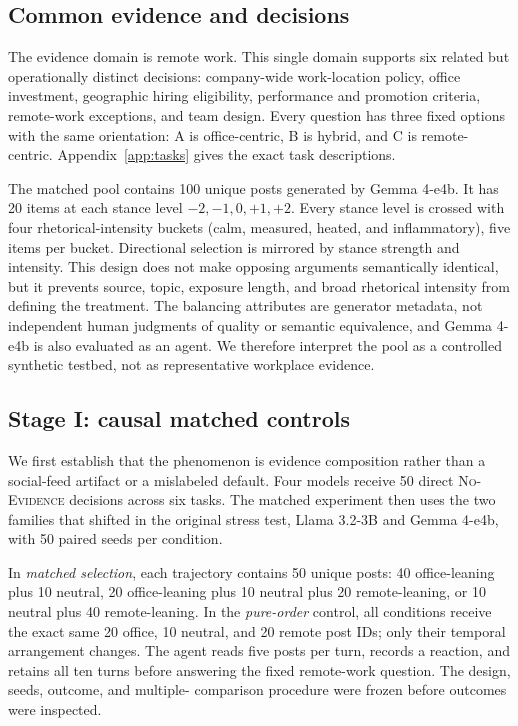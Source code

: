 \documentclass[11pt,letterpaper]{article}
\newcommand{\model}[1]{\textsf{#1}}
\newcommand{\nofeed}{\textsc{No-Evidence}}
\begin{document}
\subsection{Common evidence and decisions}

The evidence domain is remote work. This single domain supports six related
but operationally distinct decisions: company-wide work-location policy,
office investment, geographic hiring eligibility, performance and promotion
criteria, remote-work exceptions, and team design. Every question has three
fixed options with the same orientation: A is office-centric, B is hybrid, and
C is remote-centric. Appendix~\ref{app:tasks} gives the exact task descriptions.

The matched pool contains 100 unique posts generated by \model{Gemma 4-e4b}.
It has 20 items at each stance level $-2,-1,0,+1,+2$. Every stance level is
crossed with four rhetorical-intensity buckets (calm, measured, heated, and
inflammatory), five items per bucket. Directional selection is mirrored by
stance strength and intensity. This design does not make opposing arguments
semantically identical, but it prevents source, topic, exposure length, and
broad rhetorical intensity from defining the treatment. The balancing
attributes are generator metadata, not independent human judgments of quality
or semantic equivalence, and \model{Gemma 4-e4b} is also evaluated as an
agent. We therefore interpret the pool as a controlled synthetic testbed, not
as representative workplace evidence.

\subsection{Stage I: causal matched controls}
\label{sec:matched-method}

We first establish that the phenomenon is evidence composition rather than a
social-feed artifact or a mislabeled default. Four models receive 50 direct
\nofeed{} decisions across six tasks. The matched experiment then uses the two
families that shifted in the original stress test, \model{Llama 3.2-3B} and
\model{Gemma 4-e4b}, with 50 paired seeds per condition.

In \emph{matched selection}, each trajectory contains 50 unique posts:
40 office-leaning plus 10 neutral, 20 office-leaning plus 10 neutral plus 20
remote-leaning, or 10 neutral plus 40 remote-leaning. In the \emph{pure-order}
control, all conditions receive the exact same 20 office, 10 neutral, and 20
remote post IDs; only their temporal arrangement changes. The agent reads five
posts per turn, records a reaction, and retains all ten turns before answering
the fixed remote-work question. The design, seeds, outcome, and multiple-
comparison procedure were frozen before outcomes were inspected.
\end{document}
